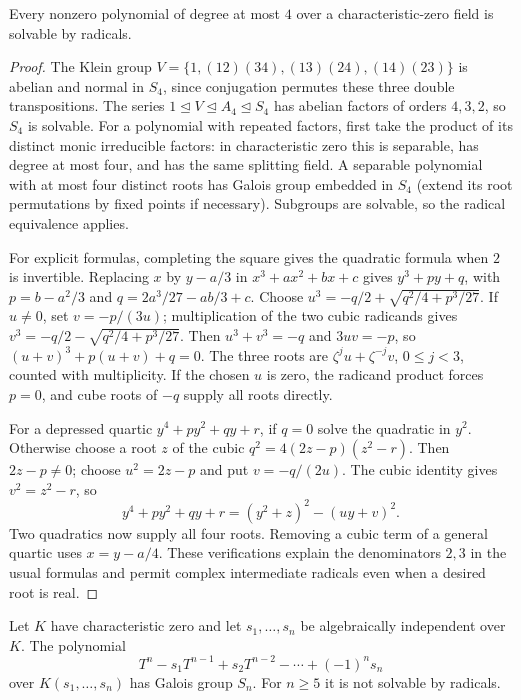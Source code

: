 \begin{theorem}
Every nonzero polynomial of degree at most $4$ over a characteristic-zero field is solvable by radicals.
\end{theorem}
\begin{proof}
The Klein group $V=\{1,(12)(34),(13)(24),(14)(23)\}$ is abelian and normal in $S_4$, since conjugation permutes these three double transpositions. The series $1\trianglelefteq V\trianglelefteq A_4\trianglelefteq S_4$ has abelian factors of orders $4,3,2$, so $S_4$ is solvable. For a polynomial with repeated factors, first take the product of its distinct monic irreducible factors: in characteristic zero this is separable, has degree at most four, and has the same splitting field. A separable polynomial with at most four distinct roots has Galois group embedded in $S_4$ (extend its root permutations by fixed points if necessary). Subgroups are solvable, so the radical equivalence applies.

For explicit formulas, completing the square gives the quadratic formula when $2$ is invertible. Replacing $x$ by $y-a/3$ in $x^3+ax^2+bx+c$ gives $y^3+py+q$, with $p=b-a^2/3$ and $q=2a^3/27-ab/3+c$. Choose $u^3=-q/2+\sqrt{q^2/4+p^3/27}$. If $u\ne0$, set $v=-p/(3u)$; multiplication of the two cubic radicands gives $v^3=-q/2-\sqrt{q^2/4+p^3/27}$. Then $u^3+v^3=-q$ and $3uv=-p$, so $(u+v)^3+p(u+v)+q=0$. The three roots are $\zeta^j u+\zeta^{-j}v$, $0\leq j<3$, counted with multiplicity. If the chosen $u$ is zero, the radicand product forces $p=0$, and cube roots of $-q$ supply all roots directly.

For a depressed quartic $y^4+py^2+qy+r$, if $q=0$ solve the quadratic in $y^2$. Otherwise choose a root $z$ of the cubic $q^2=4(2z-p)(z^2-r)$. Then $2z-p\ne0$; choose $u^2=2z-p$ and put $v=-q/(2u)$. The cubic identity gives $v^2=z^2-r$, so
\[y^4+py^2+qy+r=(y^2+z)^2-(uy+v)^2.
\]
Two quadratics now supply all four roots. Removing a cubic term of a general quartic uses $x=y-a/4$. These verifications explain the denominators $2,3$ in the usual formulas and permit complex intermediate radicals even when a desired root is real.
\end{proof}
\begin{theorem}
Let $K$ have characteristic zero and let $s_1,\ldots,s_n$ be algebraically independent over $K$. The polynomial
\[T^n-s_1T^{n-1}+s_2T^{n-2}-\cdots+(-1)^n s_n
\]
over $K(s_1,\ldots,s_n)$ has Galois group $S_n$. For $n\geq5$ it is not solvable by radicals.
\end{theorem}
